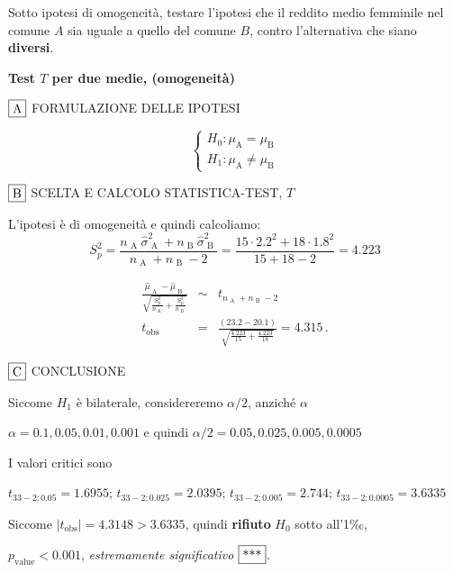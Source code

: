 \documentclass[
  11pt,
]{book}
\theoremstyle{mytheoremstyle}
\theoremstyle{mydefstyle}
\newenvironment{sol}
  {
  \begin{tcolorbox}[enhanced,breakable,arc=0.1mm,boxrule=1pt,colback=white,colframe=iblue,
  title=\bf \fontfamily{lmss}\selectfont \hspace{.5 cm} Soluzione,drop fuzzy shadow]

}{
\end{tcolorbox}
  }
\begin{document}
Sotto ipotesi di omogeneità, testare l'ipotesi che il reddito medio femminile nel comune \(A\) sia uguale a quello del comune \(B\), contro l'alternativa che siano \textbf{diversi}.

\begin{sol}
\textbf{Test \(T\) per due medie, (omogeneità)}

\(\fbox{A}\) FORMULAZIONE DELLE IPOTESI

\[\begin{cases}
   H_0: \mu_\text{A} = \mu_\text{B} \\
   H_1: \mu_\text{A} \neq \mu_\text{B} 
   \end{cases}\]

\(\fbox{B}\) SCELTA E CALCOLO STATISTICA-TEST, \(T\)

L'ipotesi è di omogeneità e quindi calcoliamo:\[
   S_p^2=\frac{n_\text{ A }\hat\sigma^2_\text{ A }+n_\text{ B }\hat\sigma^2_\text{ B }}{n_\text{ A }+n_\text{ B }-2} =
   \frac{ 15 \cdot 2.2 ^2+ 18 \cdot 1.8 ^2}{ 15 + 18 -2}= 4.223 
  \]

\begin{eqnarray*}
  \frac{\hat\mu_\text{ A } - \hat\mu_\text{ B }}
  {\sqrt{\frac {S^2_p}{n_\text{ A }}+\frac {S^2_p}{n_\text{ B }}}}&\sim&t_{n_\text{ A }+n_\text{ B }-2}\\
  t_{\text{obs}}
  &=& \frac{ ( 23.2 -  20.1 )} {\sqrt{\frac{ 4.223 }{ 15 }+\frac{ 4.223 }{ 18 }}}
  =   4.315 \, .
  \end{eqnarray*}

\(\fbox{C}\) CONCLUSIONE

Siccome \(H_1\) è bilaterale, considereremo \(\alpha/2\),
anziché \(\alpha\)

\(\alpha=0.1, 0.05, 0.01, 0.001\) e quindi \(\alpha/2=0.05, 0.025, 0.005, 0.0005\)

I valori critici sono

\(t_{33-2;0.05}=1.6955\); \(t_{33-2;0.025}=2.0395\); \(t_{33-2;0.005}=2.744\); \(t_{33-2;0.0005}=3.6335\)

Siccome \(|t_\text{obs}|=4.3148>3.6335\), quindi \textbf{rifiuto} \(H_0\) sotto all'1‰,

\(p_\text{value}<0.001\), \emph{estremamente significativo} \(\fbox{***}\).


\end{sol}
\end{document}
